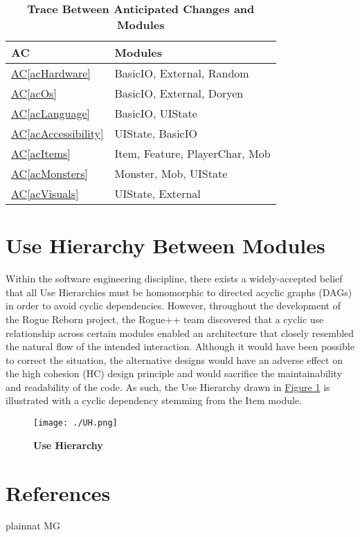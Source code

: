 \documentclass[12pt, titlepage]{article}
\newcommand{\newSection}[1]{
  \newpage
  \section{#1}
}
\newcommand{\acref}[1]{\hyperref[#1]{AC\ref{#1}}}
\begin{document}
\begin{table}[H] 
    \label{TblACT}
    \caption{\bf Trace Between Anticipated Changes and Modules}
    
    \def\arraystretch{1.1}
    \centering
    \bigskip
    \begin{tabular}{p{} p{}}

        \toprule
        \textbf{AC} & \textbf{Modules}\\
        \midrule
        \acref{acHardware} & BasicIO, External, Random\\
        \acref{acOs} & BasicIO, External, Doryen\\
        \acref{acLanguage} & BasicIO, UIState\\
        \acref{acAccessibility} & UIState, BasicIO\\
        \acref{acItems} & Item, Feature, PlayerChar, Mob\\
        \acref{acMonsters} & Monster, Mob, UIState\\
        \acref{acVisuals} & UIState, External\\

        \bottomrule
    \end{tabular}
\end{table}

\newSection{Use Hierarchy Between Modules} \label{SecUse}

    Within the software engineering discipline, there exists a widely-accepted belief that all Use Hierarchies must be homomorphic to directed acyclic graphs (DAGs) in order to avoid cyclic dependencies.  However, throughout the development of the Rogue Reborn project, the Rogue++ team discovered that a cyclic use relationship across certain modules enabled an architecture that closely resembled the natural flow of the intended interaction.  Although it would have been possible to correct the situation, the alternative designs would have an adverse effect on the high cohesion (HC) design principle and would sacrifice the maintainability and readability of the code.  As such, the Use Hierarchy drawn in \hyperref[FigUH]{Figure 1} is illustrated with a cyclic dependency stemming from the Item module.

    \begin{figure}[H]
        \label{FigUH}
        \caption{\bf Use Hierarchy}
        \centering
        \bigskip
        \texttt{[image: ./UH.png]}
    \end{figure}

\newSection{References} \label{SecRef}

     {plainnat}
     {MG}
\end{document}
